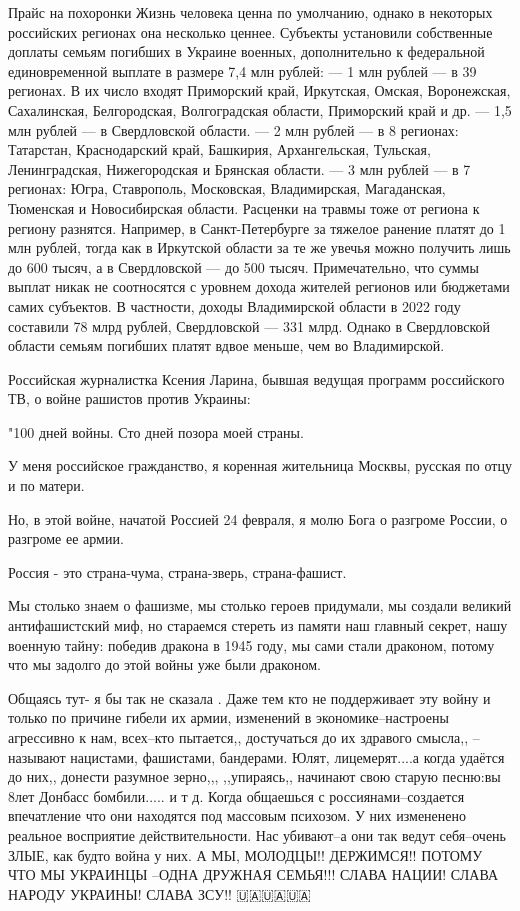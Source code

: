 Прайс на похоронки
Жизнь человека ценна по умолчанию, однако в некоторых российских регионах она несколько ценнее. Субъекты установили собственные доплаты семьям погибших в Украине военных, дополнительно к федеральной единовременной выплате в размере 7,4 млн рублей:
— 1 млн рублей — в 39 регионах. В их число входят Приморский край, Иркутская, Омская, Воронежская, Сахалинская, Белгородская, Волгоградская области, Приморский край и др.
— 1,5 млн рублей — в Свердловской области.
— 2 млн рублей — в 8 регионах: Татарстан, Краснодарский край, Башкирия, Архангельская, Тульская, Ленинградская, Нижегородская и Брянская области.
— 3 млн рублей — в 7 регионах: Югра, Ставрополь, Московская, Владимирская, Магаданская, Тюменская и Новосибирская области.
Расценки на травмы тоже от региона к региону разнятся. Например, в Санкт-Петербурге за тяжелое ранение платят до 1 млн рублей, тогда как в Иркутской области за те же увечья можно получить лишь до 600 тысяч, а в Свердловской — до 500 тысяч.
Примечательно, что суммы выплат никак не соотносятся с уровнем дохода жителей регионов или бюджетами самих субъектов. В частности, доходы Владимирской области в 2022 году составили 78 млрд рублей, Свердловской — 331 млрд. Однако в Свердловской области семьям погибших платят вдвое меньше, чем во Владимирской.

Российская журналистка Ксения Ларина, бывшая ведущая программ российского ТВ, о
войне рашистов против Украины:

"100 дней войны. Сто дней позора моей страны.

У меня российское гражданство, я коренная жительница Москвы, русская по отцу и
по матери.

Но, в этой войне, начатой Россией 24 февраля, я молю Бога о разгроме России, о
разгроме ее армии.

Россия - это страна-чума, страна-зверь, страна-фашист.

Мы столько знаем о фашизме, мы столько героев придумали, мы создали великий
антифашистский миф, но стараемся стереть из памяти наш главный секрет, нашу
военную тайну: победив дракона в 1945 году, мы сами стали драконом, потому что
мы задолго до этой войны уже были драконом.


Общаясь тут- я бы так не сказала . Даже тем кто не поддерживает эту войну и
только по причине гибели их армии, изменений в экономике--настроены агрессивно
к нам, всех--кто пытается,, достучаться до их здравого смысла,, --называют
нацистами, фашистами, бандерами. Юлят, лицемерят....а когда удаётся до них,,
донести разумное зерно,,, ,,упираясь,, начинают свою старую песню:вы 8лет
Донбасс бомбили..... и т д. Когда общаешься с россиянами--создается впечатление
что они находятся под массовым психозом. У них измененено реальное восприятие
действительности. Нас убивают--а они так ведут себя--очень ЗЛЫЕ, как будто
война у них. А МЫ, МОЛОДЦЫ!! ДЕРЖИМСЯ!! ПОТОМУ ЧТО МЫ УКРАИНЦЫ --ОДНА ДРУЖНАЯ
СЕМЬЯ!!! СЛАВА НАЦИИ! СЛАВА НАРОДУ УКРАИНЫ! СЛАВА ЗСУ!! 🇺🇦🇺🇦🇺🇦

